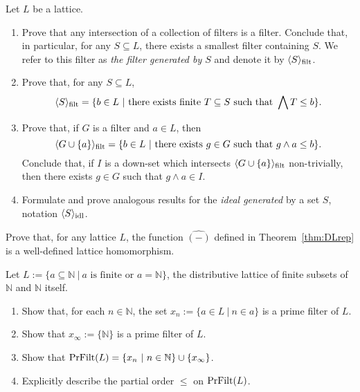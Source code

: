 \begin{exercise}\label{exe:generatefilter}
Let $L$ be a lattice.
\begin{enumerate}
\item Prove that any intersection of a collection of filters is a filter. Conclude that, in particular, for any $S \subseteq L$, there exists a smallest filter containing $S$.  We refer to this filter as \emph{the filter generated by $S$} and denote it by $\langle S \rangle_{\mathrm{filt}}$.
\item Prove that, for any $S \subseteq L$,
\[\gen{S}_{\mathrm{filt}} = \{b \in L \ | \ \text{there exists finite } T \subseteq S \text{ such that } \bigwedge T \leq b\}.\]
\item Prove that, if $G$ is a filter and $a \in L$, then
\[ \langle G \cup \{a\} \rangle_{\mathrm{filt}} = \{b \in L \ | \ \text{there exists } g \in G \text{ such that } g \wedge a \leq b\}.\]
Conclude that, if $I$ is a down-set which intersects $\langle G \cup \{a\} \rangle_{\mathrm{filt}}$ non-trivially, then there exists $g \in G$ such that $g \wedge a \in I$.
\item Formulate and prove analogous results for the \emph{ideal generated} by a set $S$, notation $\langle S \rangle_{\mathrm{idl}}$.
\end{enumerate}
\end{exercise}
\begin{exercise}\label{exe:hatlatticehom}
Prove that, for any lattice $L$, the function $\widehat{(-)}$ defined in Theorem~\ref{thm:DLrep} is a well-defined lattice homomorphism.
\end{exercise}
\begin{exercise}\label{exe:finitesubsetsprimes}
Let $L := \{a \subseteq \mathbb{N} \ | \ a \text{ is finite or } a = \mathbb{N}\}$, the distributive lattice of finite subsets of $\mathbb{N}$ and $\mathbb{N}$ itself.
\begin{enumerate}
\item Show that, for each $n \in \mathbb{N}$, the set $x_n := \{a \in L \ | \ n \in a\}$ is a prime filter of $L$.
\item Show that $x_{\infty} := \{\mathbb{N}\}$ is a prime filter of $L$.
\item Show that $\mathrm{PrFilt}(L) = \{x_n \ | \ n \in \mathbb{N}\} \cup \{x_\infty\}$.
\item Explicitly describe the partial order $\leq$ on $\mathrm{PrFilt}(L)$.
\end{enumerate}
\end{exercise}

